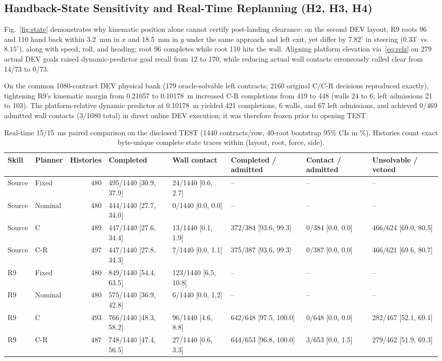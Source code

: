 \documentclass[letterpaper,10pt,conference]{ieeeconf}
\begin{document}
\subsection{Handback-State Sensitivity and Real-Time Replanning (H2, H3, H4)}
Fig.~\ref{fig:state} demonstrates why kinematic position alone cannot certify post-landing clearance: on the second DEV layout, R9 roots 96 and 110 hand back within 3.2~mm in $x$ and 18.5~mm in $y$ under the same approach and left exit, yet differ by $7.82^\circ$ in steering ($0.33^\circ$ vs.\ $8.15^\circ$), along with speed, roll, and heading; root 96 completes while root 110 hits the wall. Aligning platform elevation via~\eqref{eq:relz} on 279 actual DEV goals raised dynamic-predictor goal recall from 12 to 170, while reducing actual wall contacts erroneously called clear from 14/73 to 0/73.

On the common 1080-contract DEV physical bank (179 oracle-solvable left contracts; 2160 original C/C-R decisions reproduced exactly), tightening R9's kinematic margin from 0.21057 to 0.10178~m increased C-R completions from 419 to 448 (walls 24 to 6; left admissions 21 to 103). The platform-relative dynamic predictor at 0.10178~m yielded 421 completions, 6 walls, and 67 left admissions, and achieved 0/469 admitted wall contacts (3/1080 total) in direct online DEV execution; it was therefore frozen prior to opening TEST.

\begin{table}[t]\centering
\caption{Real-time 15/15~ms paired comparison on the disclosed TEST (1440 contracts/row, 40-root bootstrap 95\% CIs in \%). Histories count exact byte-unique complete state traces within (layout, root, force, side).}
\scriptsize\setlength{\tabcolsep}{3.5pt}
\begin{tabular}{llrlllll}\toprule
Skill & Planner & Histories & Completed & Wall contact & Completed / admitted & Contact / admitted & Unsolvable / vetoed\\\midrule
Source & Fixed & 480 & 495/1440 [30.9, 37.9] & 24/1440 [0.6, 2.7] & -- & -- & --\\
Source & Nominal & 480 & 444/1440 [27.7, 34.0] & 0/1440 [0.0, 0.0] & -- & -- & --\\
Source & C & 489 & 447/1440 [27.6, 34.4] & 13/1440 [0.1, 1.9] & 372/384 [93.6, 99.3] & 0/384 [0.0, 0.0] & 466/624 [69.0, 80.5]\\
Source & C-R & 497 & 447/1440 [27.8, 34.3] & 7/1440 [0.0, 1.1] & 375/387 [93.6, 99.3] & 0/387 [0.0, 0.0] & 466/621 [69.6, 80.7]\\
R9 & Fixed & 480 & 849/1440 [54.4, 63.5] & 123/1440 [6.5, 10.8] & -- & -- & --\\
R9 & Nominal & 480 & 575/1440 [36.9, 42.8] & 6/1440 [0.0, 1.2] & -- & -- & --\\
R9 & C & 493 & 766/1440 [48.3, 58.2] & 96/1440 [4.6, 8.8] & 642/648 [97.5, 100.0] & 0/648 [0.0, 0.0] & 282/467 [52.1, 69.1]\\
R9 & C-R & 487 & 748/1440 [47.4, 56.5] & 27/1440 [0.6, 3.3] & 644/653 [96.8, 100.0] & 3/653 [0.0, 1.5] & 279/462 [51.9, 69.3]\\
\bottomrule\end{tabular}\label{tab:system}
\end{table}
\end{document}
